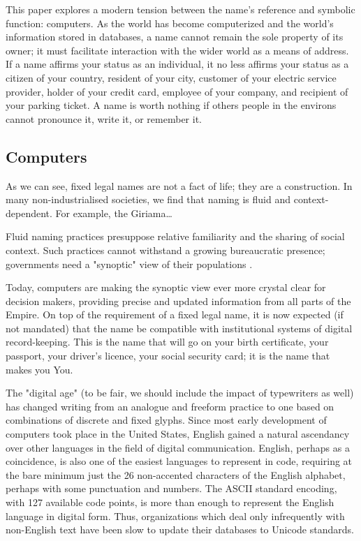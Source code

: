 This paper explores a modern tension between the name's reference and symbolic
function: computers. As the world has become computerized and the world's
information stored in databases, a name cannot remain the sole
property of its owner; it must facilitate interaction with the wider world as a
means of address. If a name affirms your status as an individual, it no less
affirms your status as a citizen of your country, resident of your city,
customer of your electric service provider, holder of your credit card, employee
of your company, and recipient of your parking ticket. A name is worth nothing
if others people in the environs cannot pronounce it, write it, or remember it.

\subsection{Computers}

As we can see, fixed legal names are not a fact of life; they are a
construction. In many non-industrialised societies, we find that naming is fluid
and context-dependent. For example, the Giriama…

Fluid naming practices presuppose relative familiarity and the sharing of social
context. Such practices cannot withstand a growing bureaucratic presence;
governments need a "synoptic" view of their populations \parencite{scott02}.

Today, computers are making the synoptic view ever more crystal clear for
decision makers, providing precise and updated information from all parts of the
Empire. On top of the requirement of a fixed legal name, it is now expected (if
not mandated) that the name be compatible with institutional systems of digital
record-keeping. This is the name that will go on your birth certificate, your
passport, your driver's licence, your social security card; it is the name that
makes you You.

The "digital age" (to be fair, we should include the impact of typewriters as
well) has changed writing from an analogue and freeform practice to one based on
combinations of discrete and fixed glyphs. Since most early development of
computers took place in the United States, English gained a natural ascendancy
over other languages in the field of digital communication.  English, perhaps as
a coincidence, is also one of the easiest languages to represent in code,
requiring at the bare minimum just the 26 non-accented characters of the English
alphabet, perhaps with some punctuation and numbers.  The ASCII standard
encoding, with 127 available code points, is more than enough to represent the
English language in digital form.  Thus, organizations which deal only
infrequently with non-English text have been slow to update their databases to
Unicode standards.
